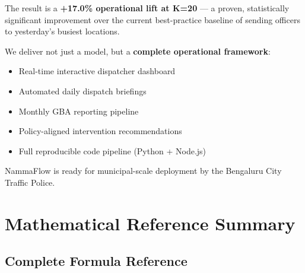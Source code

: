 \documentclass[12pt,a4paper]{article}
\begin{document}
The result is a \textbf{+17.0\% operational lift at K=20} — a proven, statistically significant improvement over the current best-practice baseline of sending officers to yesterday's busiest locations.

We deliver not just a model, but a \textbf{complete operational framework}:
\begin{itemize}
    \item Real-time interactive dispatcher dashboard
    \item Automated daily dispatch briefings
    \item Monthly GBA reporting pipeline
    \item Policy-aligned intervention recommendations
    \item Full reproducible code pipeline (Python + Node.js)
\end{itemize}

NammaFlow is ready for municipal-scale deployment by the Bengaluru City Traffic Police.

\newpage
\appendix

\section{Mathematical Reference Summary}

\subsection{Complete Formula Reference}
\end{document}
